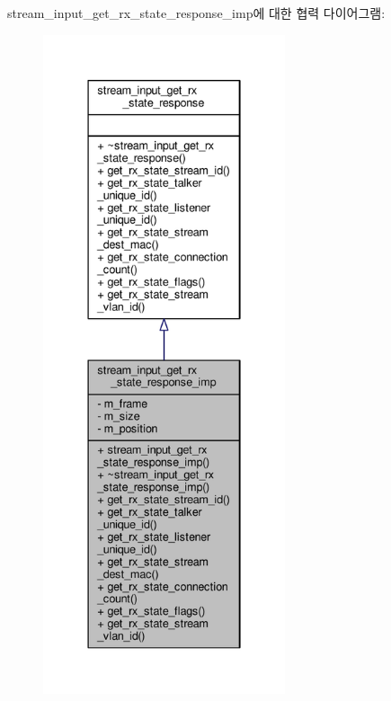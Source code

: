 stream\+\_\+input\+\_\+get\+\_\+rx\+\_\+state\+\_\+response\+\_\+imp에 대한 협력 다이어그램\+:
\nopagebreak
\begin{figure}[H]
\begin{center}
\leavevmode
\includegraphics[height=550pt]{classavdecc__lib_1_1stream__input__get__rx__state__response__imp__coll__graph}
\end{center}
\end{figure}
